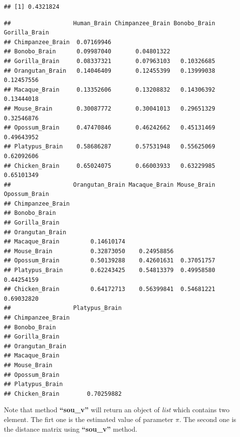 \documentclass[]{book}
\newenvironment{Shaded}{\begin{snugshade}}{\end{snugshade}}
\newcommand{\KeywordTok}[1]{\textcolor[rgb]{0.13,0.29,0.53}{\textbf{#1}}}
\newcommand{\NormalTok}[1]{#1}
\newcommand{\OperatorTok}[1]{\textcolor[rgb]{0.81,0.36,0.00}{\textbf{#1}}}
\begin{document}
\begin{verbatim}
## [1] 0.4321824
\end{verbatim}

\begin{Shaded}
\end{Shaded}

\begin{verbatim}
##                  Human_Brain Chimpanzee_Brain Bonobo_Brain Gorilla_Brain
## Chimpanzee_Brain  0.07169946                                            
## Bonobo_Brain      0.09987040       0.04801322                           
## Gorilla_Brain     0.08337321       0.07963103   0.10326685              
## Orangutan_Brain   0.14046409       0.12455399   0.13999038    0.12457556
## Macaque_Brain     0.13352606       0.13208832   0.14306392    0.13444018
## Mouse_Brain       0.30087772       0.30041013   0.29651329    0.32546876
## Opossum_Brain     0.47470846       0.46242662   0.45131469    0.49643952
## Platypus_Brain    0.58686287       0.57531948   0.55625069    0.62092606
## Chicken_Brain     0.65024075       0.66003933   0.63229985    0.65101349
##                  Orangutan_Brain Macaque_Brain Mouse_Brain Opossum_Brain
## Chimpanzee_Brain                                                        
## Bonobo_Brain                                                            
## Gorilla_Brain                                                           
## Orangutan_Brain                                                         
## Macaque_Brain         0.14610174                                        
## Mouse_Brain           0.32873050    0.24958856                          
## Opossum_Brain         0.50139288    0.42601631  0.37051757              
## Platypus_Brain        0.62243425    0.54813379  0.49958580    0.44254159
## Chicken_Brain         0.64172713    0.56399841  0.54681221    0.69032820
##                  Platypus_Brain
## Chimpanzee_Brain               
## Bonobo_Brain                   
## Gorilla_Brain                  
## Orangutan_Brain                
## Macaque_Brain                  
## Mouse_Brain                    
## Opossum_Brain                  
## Platypus_Brain                 
## Chicken_Brain        0.70259882
\end{verbatim}

Note that method \textbf{``sou\_v''} will return an object of \emph{list} which contains two element. The firt one is the estimated value of parameter \(\pi\). The second one is the distance matrix using \textbf{``sou\_v''} method.
\end{document}
